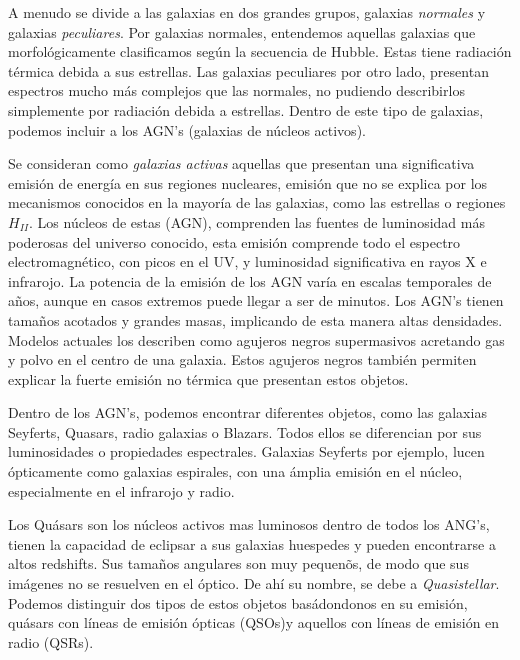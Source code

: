 \documentclass[a4paper,10pt]{article}
\begin{document}
A menudo se divide a las galaxias en dos grandes grupos, galaxias \textit{normales} y galaxias \textit{peculiares}. Por galaxias normales, entendemos aquellas galaxias que morfol\'ogicamente clasificamos seg\'un la secuencia de Hubble. Estas tiene radiaci\'on t\'ermica debida a sus estrellas. Las galaxias peculiares por otro lado, presentan espectros mucho m\'as complejos que las normales, no pudiendo describirlos simplemente por radiaci\'on debida a estrellas. Dentro de este tipo de galaxias, podemos incluir a los AGN's (galaxias de n\'ucleos activos). 

Se consideran como \textit{galaxias activas} aquellas que presentan una significativa emisi\'on de energ\'ia en sus regiones nucleares, emisi\'on que no se explica por los mecanismos  conocidos en la mayor\'ia de las galaxias, como las estrellas o regiones $H_{II}$. Los n\'ucleos de estas (AGN), comprenden las fuentes de luminosidad m\'as poderosas del universo conocido, esta emisi\'on comprende todo el espectro electromagn\'etico, con picos en el UV, y luminosidad significativa en rayos X e infrarojo. La potencia de la emisi\'on de los AGN var\'ia en escalas temporales de a\~nos, aunque en casos extremos puede llegar a ser de minutos. Los AGN's tienen tama\~nos acotados y grandes masas, implicando de esta manera altas densidades. Modelos actuales los describen como agujeros negros supermasivos acretando gas y polvo en el centro de una galaxia. Estos agujeros negros tambi\'en permiten explicar la fuerte emisi\'on no t\'ermica que presentan estos objetos.  

Dentro de los AGN's, podemos encontrar diferentes objetos, como las galaxias Seyferts, Quasars, radio galaxias o Blazars. Todos ellos se diferencian por sus luminosidades o propiedades espectrales. Galaxias Seyferts por ejemplo, lucen \'opticamente como galaxias espirales, con una \'amplia emisi\'on en el n\'ucleo, especialmente en el infrarojo y radio. 






Los Qu\'asars son los n\'ucleos activos mas luminosos dentro de todos los ANG's, tienen la capacidad de eclipsar a sus galaxias huespedes y pueden encontrarse a altos redshifts. Sus tama\~nos angulares son muy pequen\~os, de modo que sus im\'agenes no se resuelven en el \'optico. De ah\'i su nombre, se debe a \textit{Quasistellar}. Podemos distinguir dos tipos de estos objetos bas\'adondonos en su emisi\'on, qu\'asars con l\'ineas de emisi\'on \'opticas (QSOs)y aquellos con l\'ineas de emisi\'on en radio (QSRs). \citep{Elmegreen} \citep{Schneider}
\end{document}
